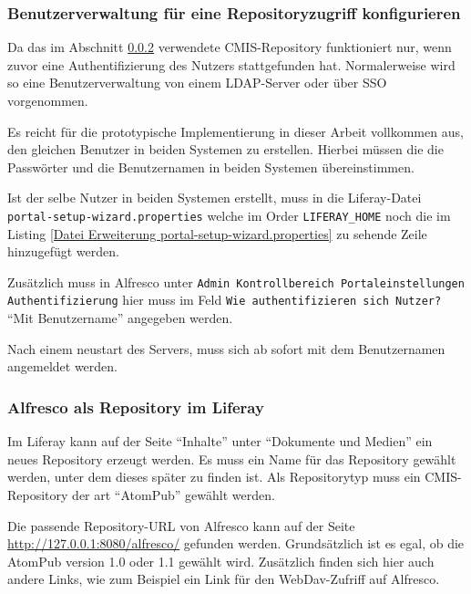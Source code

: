 \subsubsection{Benutzerverwaltung f\"ur eine Repositoryzugriff konfigurieren}
Da das im Abschnitt \ref{Alfresco als Repository im Liferay} verwendete CMIS-Repository funktioniert nur, wenn zuvor eine Authentifizierung des Nutzers stattgefunden hat. Normalerweise wird so eine Benutzerverwaltung von einem LDAP-Server oder \"uber SSO vorgenommen. 

Es reicht f\"ur die prototypische Implementierung in dieser Arbeit vollkommen aus, den gleichen Benutzer in beiden Systemen zu erstellen. Hierbei m\"ussen die die Passw\"orter und die Benutzernamen in beiden Systemen \"ubereinstimmen.

Ist der selbe Nutzer in beiden Systemen erstellt, muss in die Liferay-Datei \texttt{portal-setup-wizard.properties} welche im Order \texttt{LIFERAY\_HOME} noch die im Listing \ref{Datei Erweiterung portal-setup-wizard.properties} zu sehende Zeile hinzugef\"ugt werden. \cite{CMIS_Repo}



Zus\"atzlich muss in Alfresco unter \texttt{Admin \MVRightarrow Kontrollbereich \MVRightarrow Portaleinstellungen \MVRightarrow} \\
\texttt{Authentifizierung} hier muss im Feld \texttt{Wie authentifizieren sich Nutzer?} "`Mit Benutzername"' angegeben werden.

Nach einem neustart des Servers, muss sich ab sofort mit dem Benutzernamen angemeldet werden.

\subsubsection{Alfresco als Repository im Liferay}\label{Alfresco als Repository im Liferay}
Im Liferay kann auf der Seite "`Inhalte"' unter "`Dokumente und Medien"' ein neues Repository erzeugt werden. Es muss ein Name f\"ur das Repository gew\"ahlt werden, unter dem dieses sp\"ater zu finden ist. Als Repositorytyp muss ein \ac{CMIS}-Repository der art "`AtomPub"' gew\"ahlt werden.

Die passende Repository-URL von Alfresco kann auf der Seite \url{http://127.0.0.1:8080/alfresco/} gefunden werden. Grunds\"atzlich ist es egal, ob die AtomPub version 1.0 oder 1.1 gew\"ahlt wird. Zus\"atzlich finden sich hier auch andere Links, wie zum Beispiel ein Link f\"ur den WebDav-Zufriff auf Alfresco.

